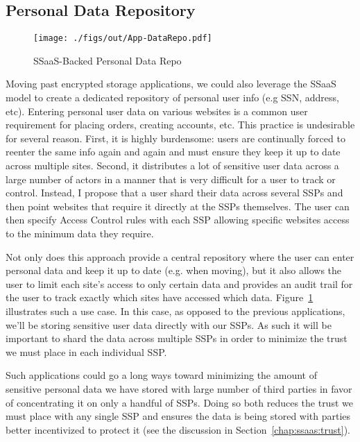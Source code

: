 \subsection{Personal Data Repository}

\begin{figure}[t]
  \centering
  \texttt{[image: ./figs/out/App-DataRepo.pdf]}
  \caption{SSaaS-Backed Personal Data Repo}
  \label{fig:apps-datarepo}
\end{figure}

Moving past encrypted storage applications, we could also leverage the
SSaaS model to create a dedicated repository of personal user info
(e.g SSN, address, etc). Entering personal user data on various
websites is a common user requirement for placing orders, creating
accounts, etc. This practice is undesirable for several reason. First,
it is highly burdensome: users are continually forced to reenter the
same info again and again and must ensure they keep it up to date
across multiple sites. Second, it distributes a lot of sensitive user
data across a large number of actors in a manner that is very
difficult for a user to track or control. Instead, I propose that a
user shard their data across several SSPs and then point websites that
require it directly at the SSPs themselves. The user can then specify
Access Control rules with each SSP allowing specific websites access
to the minimum data they require.

Not only does this approach provide a central repository where the
user can enter personal data and keep it up to date (e.g. when
moving), but it also allows the user to limit each site's access to
only certain data and provides an audit trail for the user to track
exactly which sites have accessed which
data. Figure~\ref{fig:apps-datarepo} illustrates such a use case. In
this case, as opposed to the previous applications, we'll be storing
sensitive user data directly with our SSPs. As such it will be
important to shard the data across multiple SSPs in order to minimize
the trust we must place in each individual SSP.

Such applications could go a long ways toward minimizing the amount of
sensitive personal data we have stored with large number of third
parties in favor of concentrating it on only a handful of SSPs. Doing
so both reduces the trust we must place with any single SSP and
ensures the data is being stored with parties better incentivized to
protect it (see the discussion in Section~\ref{chap:ssaas:trust}).

